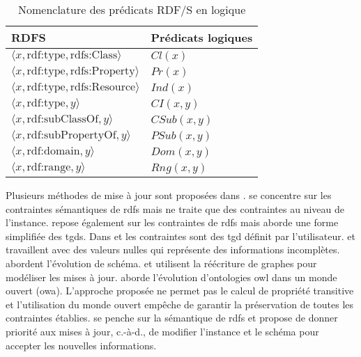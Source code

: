 \begin{table}[ht]
    \centering
    \begin{tabular}{|l|l|}
        \hline
        RDFS                                                       & Prédicats logiques \\
        \hline
        $\langle x, \text{rdf:type}, \text{rdfs:Class} \rangle$    & $Cl(x)$            \\
        $\langle x, \text{rdf:type}, \text{rdfs:Property} \rangle$ & $Pr(x)$            \\
        $\langle x, \text{rdf:type}, \text{rdfs:Resource} \rangle$ & $Ind(x)$           \\
        $\langle x, \text{rdf:type}, y \rangle$                    & $CI(x, y)$         \\
        $\langle x, \text{rdf:subClassOf}, y \rangle$              & $CSub(x, y)$       \\
        $\langle x, \text{rdf:subPropertyOf}, y \rangle$           & $PSub(x, y)$       \\
        $\langle x, \text{rdf:domain}, y \rangle$                  & $Dom(x, y)$        \\
        $\langle x, \text{rdf:range}, y \rangle$                   & $Rng(x, y)$        \\
        \hline
    \end{tabular}
    \caption{Nomenclature des prédicats RDF/S en logique}
    \label{table:update:soa:rdfs}
\end{table}

Plusieurs méthodes de mise à jour sont proposées dans \cite{flourisFormalFoundationsRDF2013,goasdoueEfficientQueryAnswering2013,mahfoudhAdaptationOntologiesAvec2015,halfeld-ferrariRDFUpdatesConstraints2017,chabinUsingGraphGrammar2019,chabinConsistentUpdatingDatabases2020}.
\cite{goasdoueEfficientQueryAnswering2013} se concentre sur les contraintes sémantiques de \gls{rdfs} mais ne traite que des contraintes au niveau de l'instance.
\cite{halfeld-ferrariRDFUpdatesConstraints2017} repose également sur les contraintes de \gls{rdfs} mais aborde une forme simplifiée des \glspl{tgd}.
Dans \cite{flourisFormalFoundationsRDF2013} et \cite{chabinUsingGraphGrammar2019} les contraintes sont des \gls{tgd} définit par l'utilisateur.
\cite{halfeld-ferrariRDFUpdatesConstraints2017} et \cite{chabinUsingGraphGrammar2019} travaillent avec des valeurs nulles qui représente des informations incomplètes.
\cite{flourisFormalFoundationsRDF2013,goasdoueEfficientQueryAnswering2013} abordent l'évolution de schéma.
\cite{mahfoudhAdaptationOntologiesAvec2015} et \cite{chabinUsingGraphGrammar2019} utilisent la réécriture de graphes pour modéliser les mises à jour.
\cite{mahfoudhAdaptationOntologiesAvec2015,mahfoudhAlgebraicGraphTransformations2015} aborde l'évolution d'ontologies \gls{owl} dans un monde ouvert (\acs{owa}).
L'approche proposée ne permet pas le calcul de propriété transitive et l'utilisation du monde ouvert empêche de garantir la préservation de toutes les contraintes établies.
\cite{chabinUsingGraphGrammar2019} se penche sur la sémantique de \gls{rdfs} et propose de donner priorité aux mises à jour, c.-à-d., de modifier l'instance et le schéma pour accepter les nouvelles informations.

